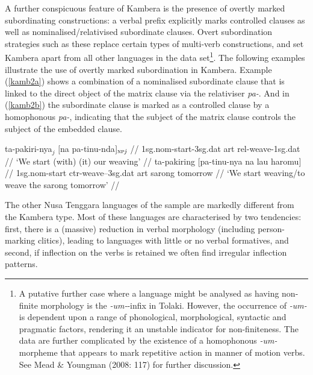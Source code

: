 A further conspicuous feature of Kambera is the presence of overtly marked subordinating constructions: a verbal prefix explicitly marks controlled clauses as well as nominalised/relativised subordinate clauses. Overt subordination strategies such as these replace certain types of multi-verb constructions, and set Kambera apart from all other languages in the data set\footnote{A putative further case where a language might be analysed as having non-finite morphology is the \textit{-um-}-infix in Tolaki. However, the occurrence of \textit{-um-} is dependent upon a range of phonological, morphological, syntactic and pragmatic factors, rendering it an unstable indicator for non-finiteness. The data are further complicated by the existence of a homophonous \textit{-um-} morpheme that appears to mark repetitive action in manner of motion verbs. See Mead \& Youngman (2008: 117) for further discussion.}. The following examples illustrate the use of overtly marked subordination in Kambera. Example (\ref{kamb2a}) shows a combination of a nominalised subordinate clause that is linked to the direct object of the matrix clause via the relativiser \textit{pa-}. And in (\ref{kamb2b}) the subordinate clause is marked as a controlled clause by a homophonous \textit{pa-}, indicating that the subject of the matrix clause controls the subject of the embedded clause.

\pex 
\a \label{kamb2a}
\begingl
\gla ta-pakiri-nya$_j$ $[$na pa-tinu-nda$]_{\textsc{np} \textit{j}}$ // 
\glb \acs{1}\acs{sg}.\acs{nom}-start-\acs{3}\acs{sg}.\acs{dat} \acs{art} \acs{rel}-weave-\acs{1}\acs{sg}.\acs{dat} //
\glft `We start (with) (it) our weaving' // 
\endgl
\a \label{kamb2b}
\begingl
\gla ta-pakiring $[$pa-tinu-nya na lau haromu$]$ // 
\glb \acs{1}\acs{sg}.\acs{nom}-start \acs{ctr}-weave--\acs{3}\acs{sg}.\acs{dat} \acs{art} sarong tomorrow //
\glft `We start weaving/to weave the sarong tomorrow' // 
\endgl
\xe

The other Nusa Tenggara languages of the sample are markedly different from the Kambera type. Most of these languages are characterised by two tendencies: first, there is a (massive) reduction in verbal morphology (including person-marking clitics), leading to languages with little or no verbal formatives, and second, if inflection on the verbs is retained we often find irregular inflection patterns. 

